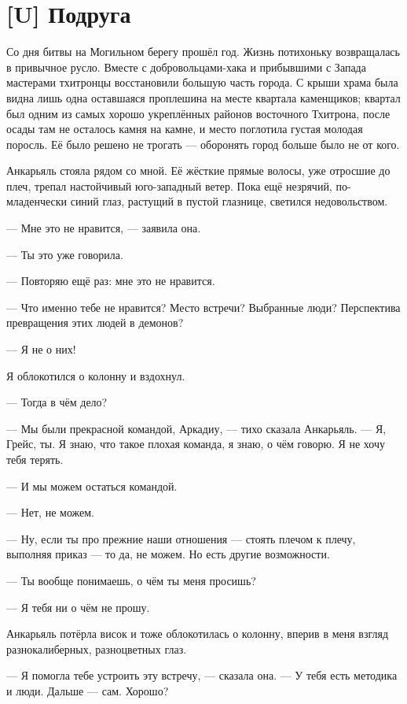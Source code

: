 \textspace

\section{[U] Подруга}

Со дня битвы на Могильном берегу прошёл год.
Жизнь потихоньку возвращалась в привычное русло.
Вместе с добровольцами-хака и прибывшими с Запада мастерами тхитронцы восстановили большую часть города.
С крыши храма была видна лишь одна оставшаяся проплешина на месте квартала каменщиков;
квартал был одним из самых хорошо укреплённых районов восточного Тхитрона, после осады там не осталось камня на камне, и место поглотила густая молодая поросль.
Её было решено не трогать --- оборонять город больше было не от кого.

Анкарьяль стояла рядом со мной.
Её жёсткие прямые волосы, уже отросшие до плеч, трепал настойчивый юго-западный ветер.
Пока ещё незрячий, по-младенчески синий глаз, растущий в пустой глазнице, светился недовольством.

--- Мне это не нравится, --- заявила она.

--- Ты это уже говорила.

--- Повторяю ещё раз: мне это не нравится.

--- Что именно тебе не нравится?
Место встречи?
Выбранные люди?
Перспектива превращения этих людей в демонов?

--- Я не о них!

Я облокотился о колонну и вздохнул.

--- Тогда в чём дело?

--- Мы были прекрасной командой, Аркадиу, --- тихо сказала Анкарьяль.
--- Я, Грейс, ты.
Я знаю, что такое плохая команда, я знаю, о чём говорю.
Я не хочу тебя терять.

--- И мы можем остаться командой.

--- Нет, не можем.

--- Ну, если ты про прежние наши отношения --- стоять плечом к плечу, выполняя приказ --- то да, не можем.
Но есть другие возможности.

--- Ты вообще понимаешь, о чём ты меня просишь?

--- Я тебя ни о чём не прошу.

Анкарьяль потёрла висок и тоже облокотилась о колонну, вперив в меня взгляд разнокалиберных, разноцветных глаз.

--- Я помогла тебе устроить эту встречу, --- сказала она.
--- У тебя есть методика и люди.
Дальше --- сам.
Хорошо?

